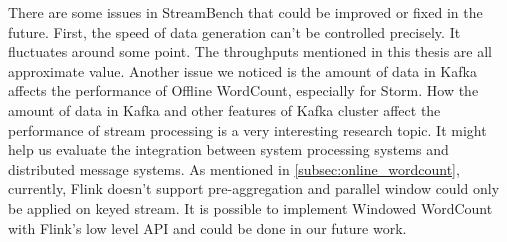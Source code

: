 There are some issues in StreamBench that could be improved or fixed in the future. First, the speed of data generation can't be controlled precisely. It fluctuates around some point. The throughputs mentioned in this thesis are all approximate value. Another issue we noticed is the amount of data in Kafka affects the performance of Offline WordCount, especially for Storm. How the amount of data in Kafka and other features of Kafka cluster affect the performance of stream processing is a very interesting research topic. It might help us evaluate the integration between system processing systems and distributed message systems. As mentioned in \cref{subsec:online_wordcount}, currently, Flink doesn't support pre-aggregation and parallel window could only be applied on keyed stream. It is possible to implement Windowed WordCount with Flink's low level API and could be done in our future work. 

\clearpage


